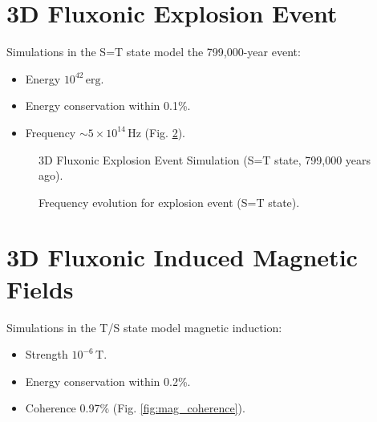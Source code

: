 \documentclass[11pt]{article}
\begin{document}
\section{3D Fluxonic Explosion Event}
Simulations in the S=T state model the 799,000-year event:
\begin{itemize}
    \item Energy \(10^{42} \, \text{erg}\).
    \item Energy conservation within 0.1\%.
    \item Frequency \(\sim 5 \times 10^{14} \, \text{Hz}\) (Fig. \ref{fig:exp_freq}).
\end{itemize}

\begin{figure}[ht]
    \centering
    \caption{3D Fluxonic Explosion Event Simulation (S=T state, 799,000 years ago).}
    \label{fig:3Dexp}
\end{figure}

\begin{figure}[ht]
    \centering
    \caption{Frequency evolution for explosion event (S=T state).}
    \label{fig:exp_freq}
\end{figure}

\section{3D Fluxonic Induced Magnetic Fields}
Simulations in the T/S state model magnetic induction:
\begin{itemize}
    \item Strength \(10^{-6} \, \text{T}\).
    \item Energy conservation within 0.2\%.
    \item Coherence 0.97\% (Fig. \ref{fig:mag_coherence}).
\end{itemize}
\end{document}
